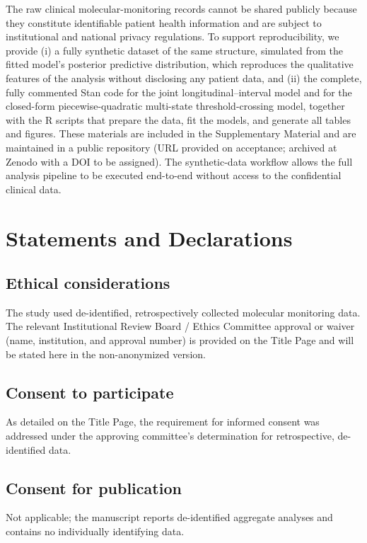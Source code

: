 \documentclass[11pt]{article}
\begin{document}
The raw clinical molecular-monitoring records cannot be shared publicly because
they constitute identifiable patient health information and are subject to
institutional and national privacy regulations. To support reproducibility, we
provide (i) a fully synthetic dataset of the same structure, simulated from the
fitted model's posterior predictive distribution, which reproduces the
qualitative features of the analysis without disclosing any patient data, and
(ii) the complete, fully commented Stan code for the joint
longitudinal--interval model and for the closed-form piecewise-quadratic
multi-state threshold-crossing model, together with the R scripts that prepare
the data, fit the models, and generate all tables and figures. These materials
are included in the Supplementary Material and are maintained in a public
repository (URL provided on acceptance; archived at Zenodo with a DOI to be
assigned). The synthetic-data workflow allows the full analysis pipeline to be
executed end-to-end without access to the confidential clinical data.

\section*{Statements and Declarations}

\subsection*{Ethical considerations}
The study used de-identified, retrospectively collected molecular
monitoring data. The relevant Institutional Review Board / Ethics
Committee approval or waiver (name, institution, and approval number) is
provided on the Title Page and will be stated here in the non-anonymized
version.

\subsection*{Consent to participate}
As detailed on the Title Page, the requirement for informed consent was
addressed under the approving committee's determination for retrospective,
de-identified data.

\subsection*{Consent for publication}
Not applicable; the manuscript reports de-identified aggregate analyses and
contains no individually identifying data.
\end{document}

